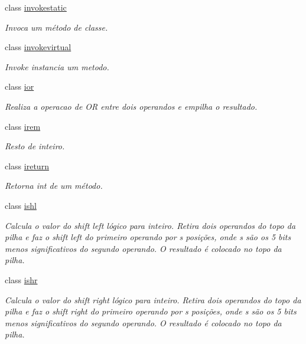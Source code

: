 \begin{DoxyCompactItemize}
class \hyperlink{class_instruction_impl_1_1invokestatic}{invokestatic}
\begin{DoxyCompactList}\small\item\em Invoca um método de classe. \end{DoxyCompactList}\item 
class \hyperlink{class_instruction_impl_1_1invokevirtual}{invokevirtual}
\begin{DoxyCompactList}\small\item\em Invoke instancia um metodo. \end{DoxyCompactList}\item 
class \hyperlink{class_instruction_impl_1_1ior}{ior}
\begin{DoxyCompactList}\small\item\em Realiza a operacao de OR entre dois operandos e empilha o resultado. \end{DoxyCompactList}\item 
class \hyperlink{class_instruction_impl_1_1irem}{irem}
\begin{DoxyCompactList}\small\item\em Resto de inteiro. \end{DoxyCompactList}\item 
class \hyperlink{class_instruction_impl_1_1ireturn}{ireturn}
\begin{DoxyCompactList}\small\item\em Retorna int de um método. \end{DoxyCompactList}\item 
class \hyperlink{class_instruction_impl_1_1ishl}{ishl}
\begin{DoxyCompactList}\small\item\em Calcula o valor do shift left lógico para inteiro. Retira dois operandos do topo da pilha e faz o shift left do primeiro operando por s posições, onde s são os 5 bits menos significativos do segundo operando. O resultado é colocado no topo da pilha. \end{DoxyCompactList}\item 
class \hyperlink{class_instruction_impl_1_1ishr}{ishr}
\begin{DoxyCompactList}\small\item\em Calcula o valor do shift right lógico para inteiro. Retira dois operandos do topo da pilha e faz o shift right do primeiro operando por s posições, onde s são os 5 bits menos significativos do segundo operando. O resultado é colocado no topo da pilha. \end{DoxyCompactList}\item 

\end{DoxyCompactItemize}
